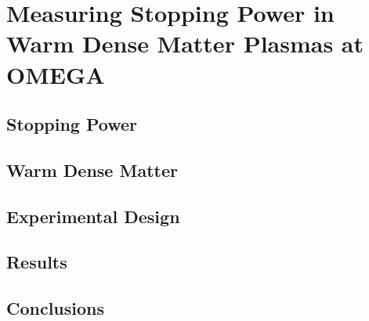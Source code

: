 \chapter{Measuring Stopping Power in Warm Dense Matter Plasmas at OMEGA}
\label{chap:WDM}

\section{Stopping Power}
\label{sec:WDM_dEdx}


\section{Warm Dense Matter}
\label{sec:WDM_WDM}


\section{Experimental Design}
\label{sec:WDM_Experimental_Design}


\section{Results}
\label{sec:WDM_Results}


\section{Conclusions}
\label{sec:WDM_Conclusions}
